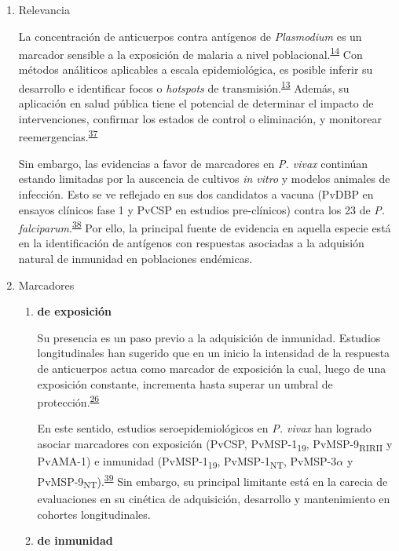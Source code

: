 \documentclass[]{article}
\begin{document}
\begin{enumerate}
\def\labelenumi{\alph{enumi}.}
\item
  Relevancia

  La concentración de anticuerpos contra antígenos de \emph{Plasmodium}
  es un marcador sensible a la exposición de malaria a nivel
  poblacional.\textsuperscript{\protect\hyperlink{ref-elliott2014}{14}}
  Con métodos análiticos aplicables a escala epidemiológica, es posible
  inferir su desarrollo e identificar focos o \emph{hotspots} de
  transmisión.\textsuperscript{\protect\hyperlink{ref-hotspots2015}{13}}
  Además, su aplicación en salud pública tiene el potencial de
  determinar el impacto de intervenciones, confirmar los estados de
  control o eliminación, y monitorear
  reemergencias.\textsuperscript{\protect\hyperlink{ref-sepulveda2015}{37}}

  Sin embargo, las evidencias a favor de marcadores en \emph{P. vivax}
  continúan estando limitadas por la auscencia de cultivos \emph{in
  vitro} y modelos animales de infección. Esto se ve reflejado en sus
  dos candidatos a vacuna (PvDBP en ensayos clínicos fase 1 y PvCSP en
  estudios pre-clínicos) contra los 23 de \emph{P.
  falciparum}.\textsuperscript{\protect\hyperlink{ref-rainbow2016}{38}}
  Por ello, la principal fuente de evidencia en aquella especie está en
  la identificación de antígenos con respuestas asociadas a la adquisión
  natural de inmunidad en poblaciones endémicas.
\item
  Marcadores

  \begin{enumerate}
  \def\labelenumii{\roman{enumii}.}
  \item
    \textbf{de exposición}

    Su presencia es un paso previo a la adquisición de inmunidad.
    Estudios longitudinales han sugerido que en un inicio la intensidad
    de la respuesta de anticuerpos actua como marcador de exposición la
    cual, luego de una exposición constante, incrementa hasta superar un
    umbral de
    protección.\textsuperscript{\protect\hyperlink{ref-Stanisic2015}{26}}

    En este sentido, estudios seroepidemiológicos en \emph{P. vivax} han
    logrado asociar marcadores con exposición (PvCSP,
    PvMSP-1\textsubscript{19}, PvMSP-9\textsubscript{RIRII} y PvAMA-1) e
    inmunidad (PvMSP-1\textsubscript{19}, PvMSP-1\textsubscript{NT},
    PvMSP-3\(\alpha\) y
    PvMSP-9\textsubscript{NT}).\textsuperscript{\protect\hyperlink{ref-cutts2014meta}{39}}
    Sin embargo, su principal limitante está en la carecia de
    evaluaciones en su cinética de adquisición, desarrollo y
    mantenimiento en cohortes longitudinales. 
  \item
    \textbf{de inmunidad}


\end{enumerate}
\end{enumerate}
\end{document}
